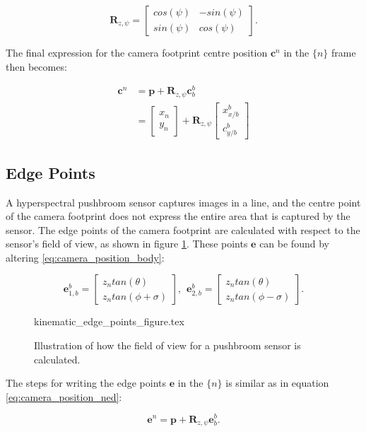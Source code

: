 \begin{equation}
	\mathbf{R}_{z,\psi} =
	\begin{bmatrix}
		cos(\psi) & -sin(\psi) \\
		sin(\psi) & cos(\psi)
	\end{bmatrix}.
\end{equation}

The final expression for the camera footprint centre position $\mathbf{c}^n$ in the $\{n\}$ frame then becomes:

\begin{equation}
\label{eq:camera_position_ned}
\begin{split}
	\mathbf{c}^n & = \mathbf{p} + \mathbf{R}_{z,\psi} \mathbf{c}_b^b \\
	& =
	\begin{bmatrix}
		x_n \\ y_n
	\end{bmatrix}
	+ \mathbf{R}_{z,\psi}
	\begin{bmatrix}
		x_{x/b}^b \\ c_{y/b}^b
	\end{bmatrix}
\end{split}
\end{equation}


\subsection{Edge Points}

A hyperspectral pushbroom sensor captures images in a line, and the centre point of the camera footprint does not express the entire area that is captured by the sensor. The edge points of the camera footprint are calculated with respect to the sensor's field of view, as shown in figure \ref{fig:kinematics_edge_points}. These points $\mathbf{e}$ can be found by altering \ref{eq:camera_position_body}:

\begin{equation}
	\mathbf{e}_{1,b}^b =
	\begin{bmatrix}
		z_n tan(\theta) \\ z_n tan(\phi + \sigma)
	\end{bmatrix}
	, \hspace{5pt}
	\mathbf{e}_{2,b}^b =
	\begin{bmatrix}
		z_n tan(\theta) \\ z_n tan(\phi - \sigma)
	\end{bmatrix}.
\end{equation}

\begin{figure}
	{kinematic_edge_points_figure.tex}
	\caption{Illustration of how the field of view for a pushbroom sensor is calculated.}
	\label{fig:kinematics_edge_points}
\end{figure}

The steps for writing the edge points $\mathbf{e}$ in the $\{n\}$ is similar as in equation \ref{eq:camera_position_ned}:

\begin{equation}
	\mathbf{e}^n = \mathbf{p} + \mathbf{R}_{z,\psi} \mathbf{e}_b^b.
\end{equation}